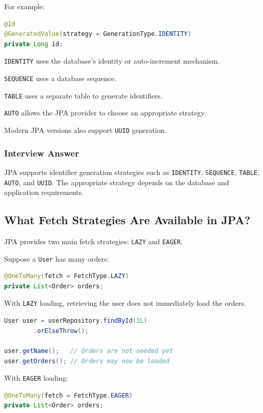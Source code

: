 \documentclass[12pt,a4paper]{article}
\begin{document}
For example:

\begin{lstlisting}[language=Java]
@Id
@GeneratedValue(strategy = GenerationType.IDENTITY)
private Long id;
\end{lstlisting}

\texttt{IDENTITY} uses the database's identity or auto-increment mechanism.

\texttt{SEQUENCE} uses a database sequence.

\texttt{TABLE} uses a separate table to generate identifiers.

\texttt{AUTO} allows the JPA provider to choose an appropriate strategy.

Modern JPA versions also support \texttt{UUID} generation.

\subsubsection*{Interview Answer}

JPA supports identifier generation strategies such as
\texttt{IDENTITY}, \texttt{SEQUENCE}, \texttt{TABLE},
\texttt{AUTO}, and \texttt{UUID}. The appropriate strategy depends on
the database and application requirements.

\subsection{What Fetch Strategies Are Available in JPA?}

JPA provides two main fetch strategies: \texttt{LAZY} and
\texttt{EAGER}.

Suppose a \texttt{User} has many orders:

\begin{lstlisting}[language=Java]
@OneToMany(fetch = FetchType.LAZY)
private List<Order> orders;
\end{lstlisting}

With \texttt{LAZY} loading, retrieving the user does not immediately load
the orders.

\begin{lstlisting}[language=Java]
User user = userRepository.findById(1L)
        .orElseThrow();

user.getName();   // Orders are not needed yet
user.getOrders(); // Orders may now be loaded
\end{lstlisting}

With \texttt{EAGER} loading:

\begin{lstlisting}[language=Java]
@OneToMany(fetch = FetchType.EAGER)
private List<Order> orders;
\end{lstlisting}
\end{document}
